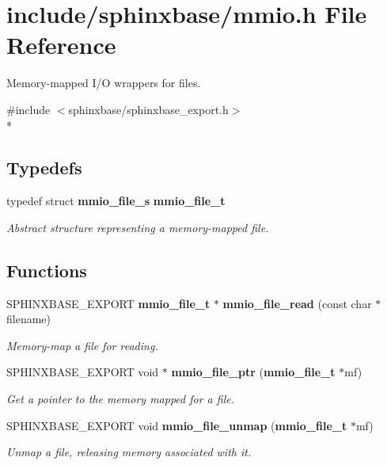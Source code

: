 \section{include/sphinxbase/mmio.h File Reference}
\label{mmio_8h}


Memory-\/mapped I/\-O wrappers for files.  


{\ttfamily \#include $<$sphinxbase/sphinxbase\-\_\-export.\-h$>$}\\*
\subsection*{Typedefs}
\begin{DoxyCompactItemize}
\item 
typedef struct {\bf mmio\-\_\-file\-\_\-s} {\bf mmio\-\_\-file\-\_\-t}\label{mmio_8h_ae27ed04d8142d77aae885c8cb8c9fa3b}

\begin{DoxyCompactList}\small\item\em Abstract structure representing a memory-\/mapped file. \end{DoxyCompactList}\end{DoxyCompactItemize}
\subsection*{Functions}
\begin{DoxyCompactItemize}
\item 
S\-P\-H\-I\-N\-X\-B\-A\-S\-E\-\_\-\-E\-X\-P\-O\-R\-T {\bf mmio\-\_\-file\-\_\-t} $\ast$ {\bf mmio\-\_\-file\-\_\-read} (const char $\ast$filename)
\begin{DoxyCompactList}\small\item\em Memory-\/map a file for reading. \end{DoxyCompactList}\item 
S\-P\-H\-I\-N\-X\-B\-A\-S\-E\-\_\-\-E\-X\-P\-O\-R\-T void $\ast$ {\bf mmio\-\_\-file\-\_\-ptr} ({\bf mmio\-\_\-file\-\_\-t} $\ast$mf)\label{mmio_8h_a5e6d8bf5cd7785563abc18c70a31ce0d}

\begin{DoxyCompactList}\small\item\em Get a pointer to the memory mapped for a file. \end{DoxyCompactList}\item 
S\-P\-H\-I\-N\-X\-B\-A\-S\-E\-\_\-\-E\-X\-P\-O\-R\-T void {\bf mmio\-\_\-file\-\_\-unmap} ({\bf mmio\-\_\-file\-\_\-t} $\ast$mf)\label{mmio_8h_a341a9c1cc8a3c4bddfd2d29a1b0993f6}

\begin{DoxyCompactList}\small\item\em Unmap a file, releasing memory associated with it. \end{DoxyCompactList}\end{DoxyCompactItemize}


